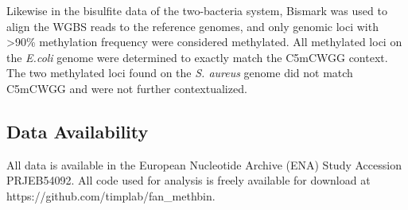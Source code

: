 Likewise in the bisulfite data of the two-bacteria system, Bismark was used to align the WGBS reads to the reference genomes, and only genomic loci with >90\% methylation frequency were considered methylated. All methylated loci on the \textit{E.coli} genome were determined to exactly match the C5mCWGG context. The two methylated loci found on the \textit{S. aureus} genome did not match C5mCWGG and were not further contextualized.

\subsection{Data Availability}
\label{sec:methods}

All data is available in the European Nucleotide Archive (ENA) Study Accession PRJEB54092. All code used for analysis is freely available for download at https://github.com/timplab/fan\_methbin.
